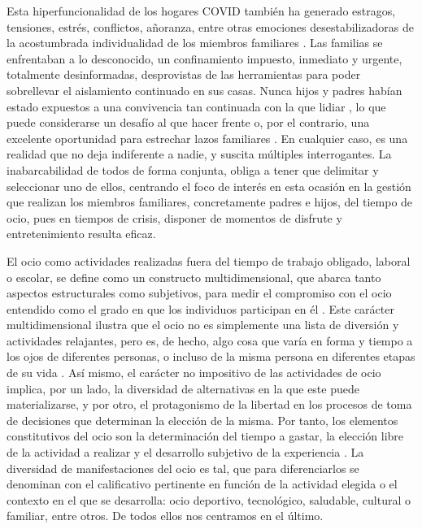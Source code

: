 \documentclass[spanish]{textolivre}
\begin{document}
Esta hiperfuncionalidad de los hogares COVID también ha generado estragos, tensiones, estrés, conflictos, añoranza, entre otras emociones desestabilizadoras de la acostumbrada individualidad de los miembros familiares \cite{belmonte2020, molina2020, robinet-serrano2020}. Las familias se enfrentaban a lo desconocido, un confinamiento impuesto, inmediato y urgente, totalmente desinformadas, desprovistas de las herramientas para poder sobrellevar el aislamiento continuado en sus casas. Nunca hijos y padres habían estado expuestos a una convivencia tan continuada con la que lidiar \cite{pedreira2020}, lo que puede considerarse un desafío al que hacer frente o, por el contrario, una excelente oportunidad para estrechar lazos familiares \cite{vestettekal2020}. En cualquier caso, es una realidad que no deja indiferente a nadie, y suscita múltiples interrogantes. La inabarcabilidad de todos de forma conjunta, obliga a tener que delimitar y seleccionar uno de ellos, centrando el foco de interés en esta ocasión en la gestión que realizan los miembros familiares, concretamente padres e hijos, del tiempo de ocio, pues en tiempos de crisis, disponer de momentos de disfrute y entretenimiento resulta eficaz.

El ocio como actividades realizadas fuera del tiempo de trabajo obligado, laboral o escolar, se define como un constructo multidimensional, que abarca tanto aspectos estructurales como subjetivos, para medir el compromiso con el ocio entendido como el grado en que los individuos participan en él \cite{newman2014}. Este carácter multidimensional ilustra que el ocio no es simplemente una lista de diversión y actividades relajantes, pero es, de hecho, algo cosa que varía en forma y tiempo a los ojos de diferentes personas, o incluso de la misma persona en diferentes etapas de su vida \cite{chen2018}. Así mismo, el carácter no impositivo de las actividades de ocio implica, por un lado, la diversidad de alternativas en la que este puede materializarse, y por otro, el protagonismo de la libertad en los procesos de toma de decisiones que determinan la elección de la misma. Por tanto, los elementos constitutivos del ocio son la determinación del tiempo a gastar, la elección libre de la actividad a realizar y el desarrollo subjetivo de la experiencia \cite{alvarez2020, kelly2012}. La diversidad de manifestaciones del ocio es tal, que para diferenciarlos se denominan con el calificativo pertinente en función de la actividad elegida o el contexto en el que se desarrolla: ocio deportivo, tecnológico, saludable, cultural o familiar, entre otros. De todos ellos nos centramos en el último. 
\end{document}
